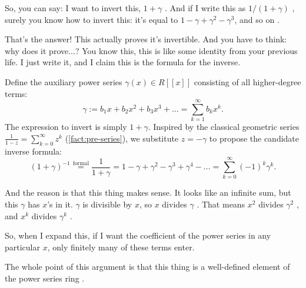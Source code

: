 \begin{proofWrapper}
\begin{speech}[00:40:25 - 00:41:31]
So, you can say: I want to invert this, $1 + \gamma$ . And if I write this as $1 / (1 + \gamma)$ , surely you know how to invert this: it's equal to $1 - \gamma + \gamma^2 - \gamma^3$, and so on .

That's the answer! This actually proves it's invertible. And you have to think: why does it prove...? You know this, this is like some identity from your previous life. I just write it, and I claim this is the formula for the inverse.
\end{speech}

\begin{content}
Define the auxiliary power series $\gamma(x) \in R[[x]]$ consisting of all higher-degree terms:
\begin{equation}\label{eq:gamma-def}
\gamma := b_1 x + b_2 x^2 + b_3 x^3 + \dots = \sum_{k=1}^\infty b_k x^k.
\end{equation}
The expression to invert is simply $1 + \gamma$. Inspired by the classical geometric series $\frac{1}{1 - z} = \sum_{k=0}^\infty z^k$ (\cref{fact:pre-series}), we substitute $z = -\gamma$ to propose the candidate inverse formula:
\begin{equation}\label{eq:geometric-series-gamma}
(1 + \gamma)^{-1} \stackrel{\text{formal}}{=} \frac{1}{1 + \gamma} = 1 - \gamma + \gamma^2 - \gamma^3 + \gamma^4 - \dots = \sum_{k=0}^\infty (-1)^k \gamma^k.
\end{equation}
\end{content}

\begin{speech}[00:41:31 - 00:42:50]
And the reason is that this thing makes sense. It looks like an infinite sum, but this $\gamma$ has $x$'s in it. $\gamma$ is divisible by $x$, so $x$ divides $\gamma$ . That means $x^2$ divides $\gamma^2$ , and $x^k$ divides $\gamma^k$ .

So, when I expand this, if I want the coefficient of the power series in any particular $x$, only finitely many of these terms enter.

The whole point of this argument is that this thing is a well-defined element of the power series ring .


\end{speech}
\end{proofWrapper}
